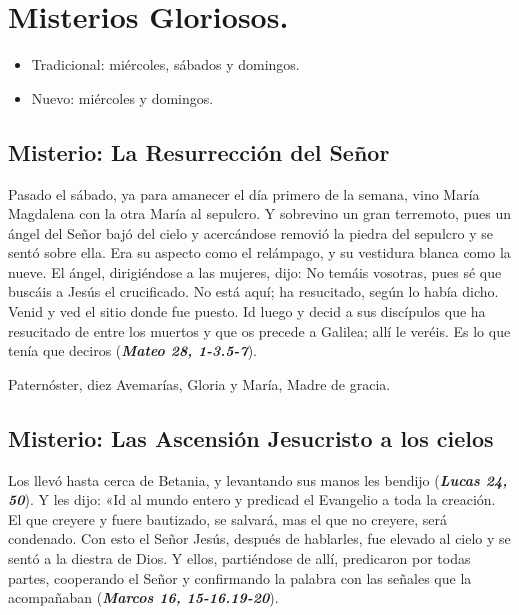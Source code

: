 \documentclass[./main.tex]{subfiles}
\newcounter{glorious-counter}
\begin{document}
\section*{Misterios Gloriosos.}
\begin{itemize}
      \item Tradicional: miércoles, sábados y domingos.
      \item Nuevo: miércoles y domingos.
\end{itemize}

\subsection*{ Misterio: La Resurrección del Señor}
Pasado el sábado, ya para amanecer el día primero de la semana, vino María Magdalena con la otra María al sepulcro. Y sobrevino un gran terremoto, 
pues un ángel del Señor bajó del cielo y acercándose removió la piedra del sepulcro y se sentó sobre ella. Era su aspecto como el relámpago, 
y su vestidura blanca como la nueve. El ángel, dirigiéndose a las mujeres, dijo: No temáis vosotras, pues sé que buscáis a Jesús el crucificado. 
No está aquí; ha resucitado, según lo había dicho. Venid y ved el sitio donde fue puesto. Id luego y decid a sus discípulos que ha resucitado de entre los muertos 
y que os precede a Galilea; allí le veréis. Es lo que tenía que deciros (\textbf{\emph{Mateo 28, 1-3.5-7}}).

\begin{center}
      Paternóster, diez Avemarías, Gloria y María, Madre de gracia.
\end{center}

\subsection*{ Misterio: Las Ascensión Jesucristo a los cielos}
Los llevó hasta cerca de Betania, y levantando sus manos les bendijo (\textbf{\emph{Lucas 24, 50}}). Y les dijo: «Id al mundo entero y predicad el Evangelio a toda la creación. 
El que creyere y fuere bautizado, se salvará, mas el que no creyere, será condenado. Con esto el Señor Jesús, después de hablarles, fue elevado al cielo y se sentó a la diestra de Dios. 
Y ellos, partiéndose de allí, predicaron por todas partes, cooperando el Señor y confirmando la palabra con las señales que la acompañaban (\textbf{\emph{Marcos 16, 15-16.19-20}}).
\end{document}
